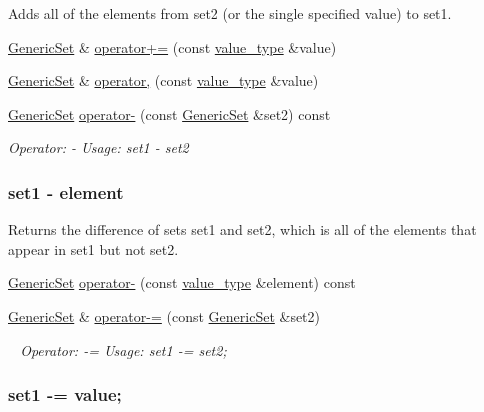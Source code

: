 \begin{DoxyCompactItemize}
\begin{DoxyCompactList}
Adds all of the elements from {\ttfamily set2} (or the single specified value) to {\ttfamily set1}. \end{DoxyCompactList}\item 
\mbox{\hyperlink{classstanfordcpplib_1_1collections_1_1GenericSet}{Generic\+Set}} \& \mbox{\hyperlink{classstanfordcpplib_1_1collections_1_1GenericSet_a47b0925fd317fb30201e28139c7370e5}{operator+=}} (const \mbox{\hyperlink{classstanfordcpplib_1_1collections_1_1GenericSet_a669c81f158766925e7293f97c0099b28}{value\+\_\+type}} \&value)
\item 
\mbox{\hyperlink{classstanfordcpplib_1_1collections_1_1GenericSet}{Generic\+Set}} \& \mbox{\hyperlink{classstanfordcpplib_1_1collections_1_1GenericSet_ad2860c6b9af5560b816dd9f10dc13f27}{operator,}} (const \mbox{\hyperlink{classstanfordcpplib_1_1collections_1_1GenericSet_a669c81f158766925e7293f97c0099b28}{value\+\_\+type}} \&value)
\item 
\mbox{\hyperlink{classstanfordcpplib_1_1collections_1_1GenericSet}{Generic\+Set}} \mbox{\hyperlink{classstanfordcpplib_1_1collections_1_1GenericSet_a5996e7e22f84d81f44c2402c2493d43b}{operator-\/}} (const \mbox{\hyperlink{classstanfordcpplib_1_1collections_1_1GenericSet}{Generic\+Set}} \&set2) const
\begin{DoxyCompactList}\small\item\em Operator\+: -\/ Usage\+: set1 -\/ set2 \subsubsection*{set1 -\/ element }

Returns the difference of sets {\ttfamily set1} and {\ttfamily set2}, which is all of the elements that appear in {\ttfamily set1} but not {\ttfamily set2}. \end{DoxyCompactList}\item 
\mbox{\hyperlink{classstanfordcpplib_1_1collections_1_1GenericSet}{Generic\+Set}} \mbox{\hyperlink{classstanfordcpplib_1_1collections_1_1GenericSet_a4c09cbefc6834fc9010e209c8ce90765}{operator-\/}} (const \mbox{\hyperlink{classstanfordcpplib_1_1collections_1_1GenericSet_a669c81f158766925e7293f97c0099b28}{value\+\_\+type}} \&element) const
\item 
\mbox{\hyperlink{classstanfordcpplib_1_1collections_1_1GenericSet}{Generic\+Set}} \& \mbox{\hyperlink{classstanfordcpplib_1_1collections_1_1GenericSet_adffcff306f0a21b87fc0eb99343a2719}{operator-\/=}} (const \mbox{\hyperlink{classstanfordcpplib_1_1collections_1_1GenericSet}{Generic\+Set}} \&set2)
\begin{DoxyCompactList}\small\item\em ~\newline
 Operator\+: -\/= Usage\+: set1 -\/= set2; \subsubsection*{set1 -\/= value; }


\end{DoxyCompactList}
\end{DoxyCompactItemize}
